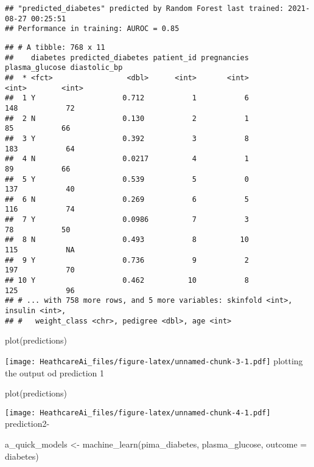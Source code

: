 \documentclass[
]{article}
\newenvironment{Shaded}{\begin{snugshade}}{\end{snugshade}}
\newcommand{\AttributeTok}[1]{\textcolor[rgb]{0.77,0.63,0.00}{#1}}
\newcommand{\FunctionTok}[1]{\textcolor[rgb]{0.00,0.00,0.00}{#1}}
\newcommand{\NormalTok}[1]{#1}
\newcommand{\OtherTok}[1]{\textcolor[rgb]{0.56,0.35,0.01}{#1}}
\begin{document}
\begin{verbatim}
## "predicted_diabetes" predicted by Random Forest last trained: 2021-08-27 00:25:51
## Performance in training: AUROC = 0.85
\end{verbatim}

\begin{verbatim}
## # A tibble: 768 x 11
##    diabetes predicted_diabetes patient_id pregnancies plasma_glucose diastolic_bp
##  * <fct>                 <dbl>      <int>       <int>          <int>        <int>
##  1 Y                    0.712           1           6            148           72
##  2 N                    0.130           2           1             85           66
##  3 Y                    0.392           3           8            183           64
##  4 N                    0.0217          4           1             89           66
##  5 Y                    0.539           5           0            137           40
##  6 N                    0.269           6           5            116           74
##  7 Y                    0.0986          7           3             78           50
##  8 N                    0.493           8          10            115           NA
##  9 Y                    0.736           9           2            197           70
## 10 Y                    0.462          10           8            125           96
## # ... with 758 more rows, and 5 more variables: skinfold <int>, insulin <int>,
## #   weight_class <chr>, pedigree <dbl>, age <int>
\end{verbatim}

\begin{Shaded}
\begin{Highlighting}[]
\FunctionTok{plot}\NormalTok{(predictions)}
\end{Highlighting}
\end{Shaded}

\texttt{[image: HeathcareAi\_files/figure-latex/unnamed-chunk-3-1.pdf]}
plotting the output od prediction 1

\begin{Shaded}
\begin{Highlighting}[]
\FunctionTok{plot}\NormalTok{(predictions)}
\end{Highlighting}
\end{Shaded}

\texttt{[image: HeathcareAi\_files/figure-latex/unnamed-chunk-4-1.pdf]}
prediction2-

\begin{Shaded}
\begin{Highlighting}[]
\NormalTok{a\_quick\_models }\OtherTok{\textless{}{-}} \FunctionTok{machine\_learn}\NormalTok{(pima\_diabetes, plasma\_glucose, }\AttributeTok{outcome =}\NormalTok{ diabetes)}
\end{Highlighting}
\end{Shaded}
\end{document}
